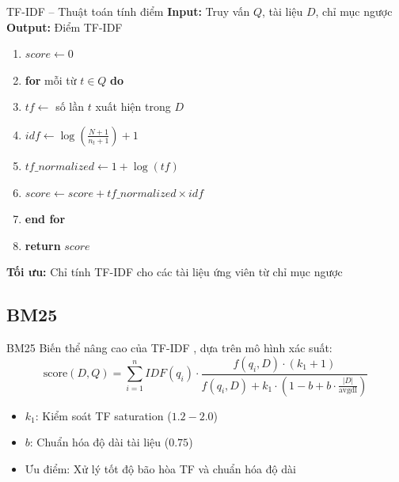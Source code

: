 \documentclass[serif, aspectratio=169]{beamer}
\newcommand{\green}[1]{\textbf{\color{codegreen}#1}}
\begin{document}
\begin{frame}{TF-IDF -- Thuật toán tính điểm}
\small
\textbf{Input:} Truy vấn $Q$, tài liệu $D$, chỉ mục ngược\\
\textbf{Output:} Điểm TF-IDF
\begin{enumerate}
    \item $score \leftarrow 0$
    \item \textbf{for} mỗi từ $t \in Q$ \textbf{do}
    \item \quad $tf \leftarrow$ số lần $t$ xuất hiện trong $D$
    \item \quad $idf \leftarrow \log\left(\frac{N + 1}{n_t + 1}\right) + 1$
    \item \quad $tf\_normalized \leftarrow 1 + \log(tf)$
    \item \quad $score \leftarrow score + tf\_normalized \times idf$
    \item \textbf{end for}
    \item \textbf{return} $score$
\end{enumerate}
\vspace{0.3cm}
\green{Tối ưu:} Chỉ tính TF-IDF cho các tài liệu ứng viên từ chỉ mục ngược
\end{frame}

\subsection{BM25}
\begin{frame}{BM25}
Biến thể nâng cao của TF-IDF \cite{manning2008introduction}, dựa trên mô hình xác suất:
\[
\text{score}(D, Q) = \sum_{i=1}^{n} IDF(q_i) \cdot \frac{f(q_i, D) \cdot (k_1 + 1)}{f(q_i, D) + k_1 \cdot (1 - b + b \cdot \frac{|D|}{\text{avgdl}})}
\]
\begin{itemize}
    \item $k_1$: Kiểm soát TF saturation ($1.2 - 2.0$)
    \item $b$: Chuẩn hóa độ dài tài liệu ($0.75$)
    \item Ưu điểm: Xử lý tốt độ bão hòa TF và chuẩn hóa độ dài
\end{itemize}
\end{frame}
\end{document}
